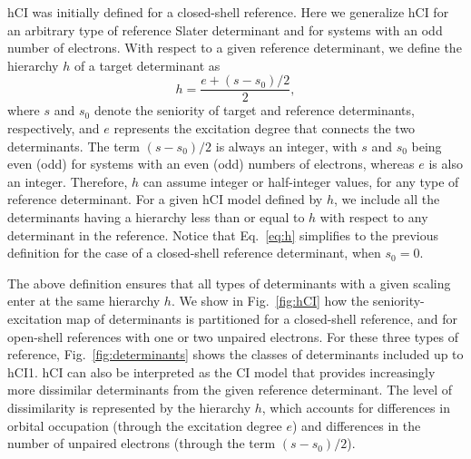 \documentclass[aip,jcp,reprint,noshowkeys,superscriptaddress]{revtex4-1}
\begin{document}
hCI was initially defined for a closed-shell reference. \cite{Kossoski_2022}
Here we generalize hCI for an arbitrary type of reference Slater determinant and for systems with an odd number of electrons.
With respect to a given reference determinant, we define the hierarchy $h$ of a target determinant as
\begin{equation}
  \label{eq:h}
  h = \frac{e+ (s-s_0)/2}{2},
\end{equation}
where $s$ and $s_0$ denote the seniority of target and reference determinants, respectively, and $e$ represents the excitation degree that connects the two determinants.
The term $(s-s_0)/2$ is always an integer, with $s$ and $s_0$ being even (odd) for systems with an even (odd) numbers of electrons, whereas $e$ is also an integer.
Therefore, $h$ can assume integer or half-integer values, for any type of reference determinant.
For a given hCI model defined by $h$, we include all the determinants having a hierarchy less than or equal to $h$ with respect to any determinant in the reference.
Notice that Eq.~\eqref{eq:h} simplifies to the previous definition \cite{Kossoski_2022} for the case of a closed-shell reference determinant, when $s_0 = 0$.

The above definition ensures that all types of determinants with a given scaling enter at the same hierarchy $h$.
We show in Fig.~\ref{fig:hCI} how the seniority-excitation map of determinants is partitioned for a closed-shell reference, and for open-shell references with one or two unpaired electrons.
For these three types of reference, Fig.~\ref{fig:determinants} shows the classes of determinants included up to hCI1.
hCI can also be interpreted as the CI model that provides increasingly more dissimilar determinants from the given reference determinant.
The level of dissimilarity is represented by the hierarchy $h$, which accounts for differences in orbital occupation (through the excitation degree $e$)
and differences in the number of unpaired electrons (through the term $(s-s_0)/2$).
 
\end{document}
